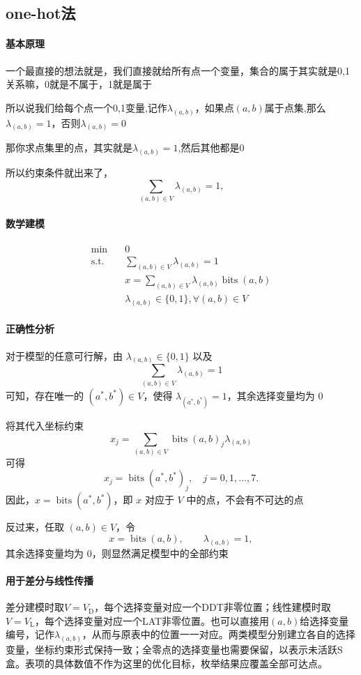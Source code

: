\subsection{one-hot法}
\label{subsec:lab4-one-hot}

\paragraph{基本原理}

一个最直接的想法就是，我们直接就给所有点一个变量，集合的属于其实就是0,1关系嘛，0就是不属于，1就是属于

所以说我们给每个点一个0,1变量,记作$\lambda_{(a,b)}$，如果点$(a,b)$属于点集,那么$\lambda_{(a,b)}=1$，否则$\lambda_{(a,b)}=0$

那你求点集里的点，其实就是\(\lambda_{(a,b)}=1\),然后其他都是0

所以约束条件就出来了，\[
\sum_{(a,b)\in V}\lambda_{(a,b)}=1,
\]

\paragraph{数学建模}
\begin{equation}
\begin{aligned}
\min\quad &0\\
\text{s.t.}\quad
&\sum_{(a,b)\in V}\lambda_{(a,b)}=1\\
&x=\sum_{(a,b)\in V}\lambda_{(a,b)}\operatorname{bits}(a,b)\\
&\lambda_{(a,b)}\in\{0,1\},\forall(a,b)\in V
\end{aligned}
\label{eq:lab4-one-hot-model}
\end{equation}


\paragraph{正确性分析}

对于模型的任意可行解，由 $\lambda_{(a,b)}\in\{0,1\}$ 以及
\[
\sum_{(a,b)\in V}\lambda_{(a,b)}=1
\]
可知，存在唯一的 $(a^*,b^*)\in V$，使得
$\lambda_{(a^*,b^*)}=1$，其余选择变量均为 $0$

将其代入坐标约束
\[
x_j=\sum_{(a,b)\in V}
\operatorname{bits}(a,b)_j\lambda_{(a,b)}
\]
可得
\[
x_j=\operatorname{bits}(a^*,b^*)_j,
\quad j=0,1,\ldots,7.
\]
因此，$x=\operatorname{bits}(a^*,b^*)$，即 $x$ 对应于 $V$ 中的点，不会有不可达的点

反过来，任取 $(a,b)\in V$，令
\[
x=\operatorname{bits}(a,b),\qquad
\lambda_{(a,b)}=1,
\]
其余选择变量均为 $0$，则显然满足模型中的全部约束

\paragraph{用于差分与线性传播}

差分建模时取$V=V_{\mathrm D}$，每个选择变量对应一个DDT非零位置；线性建模时取$V=V_{\mathrm L}$，每个选择变量对应一个LAT非零位置。也可以直接用$(a,b)$给选择变量编号，记作$\lambda_{(a,b)}$，从而与原表中的位置一一对应。两类模型分别建立各自的选择变量，坐标约束形式保持一致；全零点的选择变量也需要保留，以表示未活跃S盒。表项的具体数值不作为这里的优化目标，枚举结果应覆盖全部可达点。

